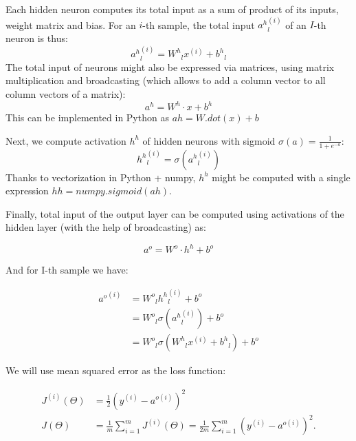 \documentclass[]{article}
\theoremstyle{definition}
\begin{document}
Each hidden neuron computes its total input as a sum of product of its
inputs, weight matrix and bias. For an $i$-th sample,
the total input
${a^{h}}^{(i)}_l $ of an $I$-th neuron is thus:
\begin{equation}
{a^h}^{(i)}_l = {W^h}_{l}x^{(i)} + {b^h}_l
\end{equation}
The total input of neurons might also be expressed via matrices,
using matrix multiplication and broadcasting (which allows to add
a column vector to all column vectors of a matrix):
\begin{equation}
{a^h} = W^h\cdot x + b^h
\end{equation}
This can be implemented in Python as $ah = W.dot(x) + b$

Next, we compute activation $h^h$ of hidden neurons with sigmoid
$\sigma(a) = \frac{1}{1+e^{-a}}$:
\begin{equation}
{h^h}^{(i)}_l=\sigma({a^h}^{(i)}_l)
\end{equation}
Thanks to vectorization in Python + numpy, $h^h$ might be computed with a single
expression $hh = numpy.sigmoid(ah)$.

Finally, total input of the output layer can be computed using
activations of the hidden layer (with the help of broadcasting) as:


\begin{equation}
a^o = W^o\cdot h^h + b^o
\end{equation}

And for I-th sample we have:

\begin{equation}
\begin{split}
{a^o}^{(i)} &= {W^o}_l{h^h}^{(i)}_l + {b^o} \\
& = {W^o}_l\sigma({a^h}^{(i)}_l) + {b^o} \\
& = {W^o}_l\sigma({W^h}_{l}x^{(i)} + {b^h}_l) + {b^o}
\end{split}
\end{equation}




We will use mean squared error as the loss function:

\begin{equation}
\begin{split}
J^{(i)}(\Theta) &= \frac{1}{2} \left( y^{(i)}- a^{o{(i)}}  \right)  ^2 \\
J(\Theta) &= \frac{1}{m}\sum_{i=1}^m J^{(i)}(\Theta)= \frac{1}{2m}\sum_{i=1}^m \left( y^{(i)}- a^{o{(i)}}  \right)  ^2  .
\end{split}
\end{equation}
\end{document}
